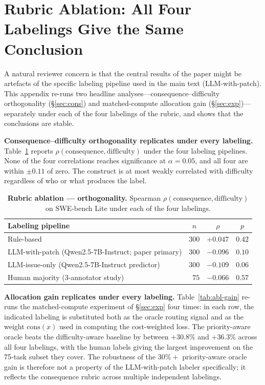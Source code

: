 \documentclass{article}
\begin{document}
\section{Rubric Ablation: All Four Labelings Give the Same Conclusion}
\label{app:rubric}

A natural reviewer concern is that the central results of the paper
might be artefacts of the specific labeling pipeline used in the main
text (LLM-with-patch). This appendix re-runs two headline analyses---consequence--difficulty
orthogonality (\S\ref{sec:cons}) and matched-compute allocation gain
(\S\ref{sec:exp})---separately under each of the four labelings of the
rubric, and shows that the conclusions are stable.

\textbf{Consequence--difficulty orthogonality replicates under every labeling.}
Table~\ref{tab:abl-ortho} reports $\rho(\mathrm{consequence}, \mathrm{difficulty})$
under the four labeling pipelines. None of the four correlations
reaches significance at $\alpha = 0.05$, and all four are within
$\pm 0.11$ of zero. The construct is at most weakly correlated with
difficulty regardless of who or what produces the label.

\begin{table}[h]
\centering
\caption{\textbf{Rubric ablation — orthogonality.} Spearman
$\rho(\mathrm{consequence}, \mathrm{difficulty})$ on SWE-bench Lite
under each of the four labelings.}
\label{tab:abl-ortho}
\small
\begin{tabular}{lccc}
\toprule
Labeling pipeline & $n$ & $\rho$ & $p$ \\
\midrule
Rule-based                                  & $300$ & $+0.047$ & $0.42$ \\
LLM-with-patch  (Qwen2.5-7B-Instruct; paper primary)   & $300$ & $-0.096$ & $0.10$ \\
LLM-issue-only  (Qwen2.5-7B-Instruct predictor)        & $300$ & $-0.109$ & $0.06$ \\
Human majority  (3-annotator study)         & $\phantom{0}75$  & $-0.066$ & $0.57$ \\
\bottomrule
\end{tabular}
\end{table}

\textbf{Allocation gain replicates under every labeling.}
Table~\ref{tab:abl-gain} re-runs the matched-compute experiment of
\S\ref{sec:exp} four times: in each row, the indicated labeling is
substituted both as the oracle routing signal and as the weight
$\mathrm{cons}(x)$ used in computing the cost-weighted loss. The
priority-aware oracle beats the difficulty-aware baseline by between
$+30.8\%$ and $+36.3\%$ across all four labelings, with the human
labels giving the largest improvement on the 75-task subset they
cover. The robustness of the $30\%+$ priority-aware oracle gain is therefore
not a property of the LLM-with-patch labeler specifically; it reflects
the consequence rubric across multiple independent labelings.
\end{document}
